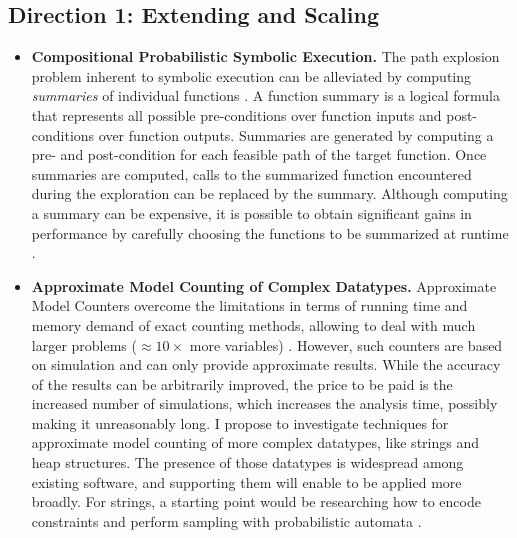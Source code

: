 \documentclass[10pt]{article}
\newcounter{list}
\begin{document}

\vspace{-4mm}
\subsection{Direction 1: Extending and Scaling \PSE{}}

\begin{itemize}
\item \textbf{Compositional Probabilistic Symbolic Execution.} The
path explosion problem inherent to symbolic execution can be
alleviated by computing \textit{summaries} of individual functions
\cite{godefroid2007compositional}. A function summary is a logical
formula that represents all possible pre-conditions over function
inputs and post-conditions over function outputs. Summaries are
generated by computing a pre- and post-condition for each feasible
path of the target function. Once summaries are computed, calls to the
summarized function encountered during the exploration can be replaced
by the summary. Although computing a summary can be expensive, it is
possible to obtain significant gains in performance by carefully
choosing the functions to be summarized at runtime
\cite{anand2008demand}.

\item \textbf{Approximate Model Counting of Complex Datatypes.}
Approximate Model Counters overcome the limitations in terms of
running time and memory demand of exact counting methods, allowing to
deal with much larger problems ($\approx 10\times$ more variables)
\cite{biere2009handbook}.  However, such counters are based on
simulation and can only provide approximate results. While the
accuracy of the results can be arbitrarily improved, the price to be
paid is the increased number of simulations, which increases the
analysis time, possibly making it unreasonably long. I propose to
investigate techniques for approximate model counting of more complex
datatypes, like strings and heap structures. The presence of those
datatypes is widespread among existing software, and supporting them
will enable \PSE{} to be applied more broadly. For strings, a starting
point would be researching how to encode constraints and perform
sampling with probabilistic automata \cite{vidal2005probabilistic}.





\end{itemize}
\end{document}
